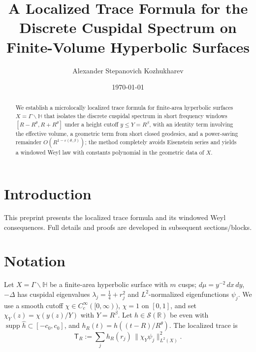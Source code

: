 \documentclass[12pt]{amsart}
\title[A Localized Trace Formula]{A Localized Trace Formula for the Discrete Cuspidal Spectrum on Finite-Volume Hyperbolic Surfaces}
\author{Alexander Stepanovich Kozhukharev}
\date{\today}
\numberwithin{equation}{section}
\theoremstyle{plain}
\theoremstyle{definition}
\theoremstyle{remark}
\newcommand{\HH}{\mathbb{H}}
\newcommand{\RR}{\mathbb{R}}
\DeclareMathOperator{\supp}{supp}
\newcommand{\Lap}{\Delta}
\newcommand{\TR}{\mathsf{T}_R}
\begin{document}
\begin{abstract}
We establish a microlocally localized trace formula for finite-area hyperbolic surfaces $X=\Gamma\backslash\HH$ that isolates the discrete cuspidal spectrum in short frequency windows $[R-R^\theta,R+R^\theta]$ under a height cutoff $y\le Y=R^\beta$, with an identity term involving the effective volume, a geometric term from short closed geodesics, and a power-saving remainder $O(R^{1-\varepsilon(\theta,\beta)})$; the method completely avoids Eisenstein series and yields a windowed Weyl law with constants polynomial in the geometric data of $X$.
\end{abstract}


\maketitle

\tableofcontents



\section{Introduction}
This preprint presents the localized trace formula and its windowed Weyl consequences. Full details and proofs are developed in subsequent sections/blocks.

\section{Notation}
Let $X=\Gamma\backslash\HH$ be a finite-area hyperbolic surface with $m$ cusps; $d\mu=y^{-2}\,dx\,dy$, $-\Lap$ has cuspidal eigenvalues $\lambda_j=\tfrac14+r_j^2$ and $L^2$-normalized eigenfunctions $\psi_j$.
We use a smooth cutoff $\chi\in C_c^\infty([0,\infty))$, $\chi=1$ on $[0,1]$, and set $\chi_Y(z)=\chi(y(z)/Y)$ with $Y=R^\beta$.
Let $h\in\mathcal{S}(\RR)$ be even with $\supp \widehat{h}\subset[-c_0,c_0]$, and $h_R(t)=h((t-R)/R^\theta)$.
The localized trace is
\begin{equation}\label{eq:TR-def}
\TR := \sum_j h_R(r_j)\,\|\chi_Y\psi_j\|_{L^2(X)}^2.
\end{equation}

\end{document}
